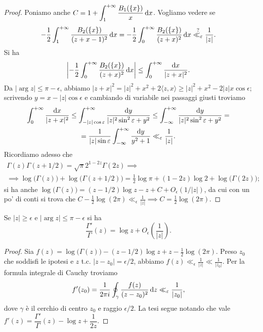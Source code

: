\begin{proof}
  Poniamo anche $\displaystyle C=1+\int_1^{+\infty} \frac{B_1(\{x\})}{x}\mathop{}\!\mathrm{d} x$. Vogliamo vedere se
  $$-\frac{1}{2}\int_1^{+\infty}\frac{B_2(\{x\})}{(z+x-1)^2}\mathop{}\!\mathrm{d} x=-\frac{1}{2}\int_0^{+\infty}\frac{B_2(\{x\})}{(z+x)^2}\mathop{}\!\mathrm{d} x \overset{?}{\ll_{\varepsilon}} \frac{1}{|z|}.$$
  Si ha
  $$\left|-\frac{1}{2}\int_0^{+\infty}\frac{B_2(\{x\})}{(z+x)^2}\mathop{}\!\mathrm{d} x\right| \le \int_0^{+\infty} \frac{\mathop{}\!\mathrm{d} x}{|z+x|^2}.$$
  Da $|\arg{z}| \le \pi-\epsilon$, abbiamo $|z+x|^2=|z|^2+x^2+2\langle z,x \rangle \ge |z|^2+x^2-2|z|x\cos{\epsilon}$; scrivendo $y=x-|z|\cos{\epsilon}$ e cambiando di variabile nei passaggi giusti troviamo
  \begin{gather*}
    \int_0^{+\infty} \frac{\mathop{}\!\mathrm{d} x}{|z+x|^2} \le \int_{-|z|\cos{\varepsilon}}^{+\infty} \frac{\mathop{}\!\mathrm{d} y}{|z|^2\sin^2{\varepsilon}+y^2} \le \int_{-\infty}^{+\infty} \frac{\mathop{}\!\mathrm{d} y}{|z|^2\sin^2{\varepsilon}+y^2}= \\
    =\frac{1}{|z|\sin{\varepsilon}}\int_{-\infty}^{+\infty} \frac{\mathop{}\!\mathrm{d} y}{y^2+1} \ll_{\varepsilon} \frac{1}{|z|}.
  \end{gather*}
  Ricordiamo adesso che
  \begin{gather*}
    \Gamma(z)\Gamma(z+1/2)=\sqrt{\pi}2^{1-2z}\Gamma(2z) \implies \\
    \implies \log\big(\Gamma(z)\big)+\log\big(\Gamma(z+1/2)\big)=\frac{1}{2}\log{\pi}+(1-2z)\log{2}+\log\big(\Gamma(2z)\big);
  \end{gather*}
  si ha anche $\log\big(\Gamma(z)\big)=(z-1/2)\log{z}-z+C+O_{\epsilon}(1/|z|)$, da cui con un po' di conti si trova che $C-\frac{1}{2}\log(2\pi) \ll_{\epsilon} \frac{1}{|z|} \implies C=\frac{1}{2}\log(2\pi)$.
\end{proof}

\begin{cor}
  Se $|z| \ge \epsilon$ e $|\arg{z}| \le \pi-\epsilon$ si ha $$\frac{\Gamma'}{\Gamma}(z)=\log{z}+O_{\epsilon}\left(\frac{1}{|z|}\right).$$
\end{cor}

\begin{proof}
  Sia $f(z)=\log\big(\Gamma(z)\big)-(z-1/2)\log{z}+z-\frac{1}{2}\log(2\pi)$. Preso $z_0$ che soddisfi le ipotesi e $z$ t.c. $|z-z_0|=\epsilon/2$, abbiamo $f(z) \ll_{\epsilon} \frac{1}{|z|} \ll \frac{1}{|z_0|}$. Per la formula integrale di Cauchy troviamo
  $$f'(z_0)=\frac{1}{2\pi i}\oint_{\gamma} \frac{f(z)}{(z-z_0)^2}\mathop{}\!\mathrm{d} z \ll_{\varepsilon} \frac{1}{|z_0|},$$
  dove $\gamma$ è il cerchio di centro $z_0$ e raggio $\epsilon/2$. La tesi segue notando che vale $f'(z)=\dfrac{\Gamma'}{\Gamma}(z)-\log{z}+\dfrac{1}{2z}$.
\end{proof}

